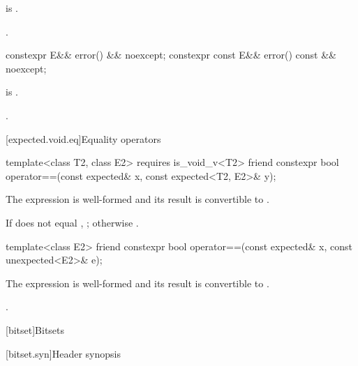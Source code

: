 \begin{itemdescr}
\pnum
\expects
{} is .

\pnum
\returns
{}.
\end{itemdescr}

%
\begin{itemdecl}
constexpr E&& error() && noexcept;
constexpr const E&& error() const && noexcept;
\end{itemdecl}

\begin{itemdescr}
\pnum
\expects
{} is .

\pnum
\returns
{}.
\end{itemdescr}

[expected.void.eq]{Equality operators}

%
\begin{itemdecl}
template<class T2, class E2> requires is_void_v<T2>
  friend constexpr bool operator==(const expected& x, const expected<T2, E2>& y);
\end{itemdecl}

\begin{itemdescr}
\pnum
\mandates
The expression  is well-formed and
its result is convertible to .

\pnum
\returns
If  does not equal , ;
otherwise .
\end{itemdescr}

%
\begin{itemdecl}
template<class E2>
  friend constexpr bool operator==(const expected& x, const unexpected<E2>& e);
\end{itemdecl}

\begin{itemdescr}
\pnum
\mandates
The expression  is well-formed and
its result is convertible to .

\pnum
\returns
{}.
\end{itemdescr}

[bitset]{Bitsets}
%

[bitset.syn]{Header  synopsis}%

